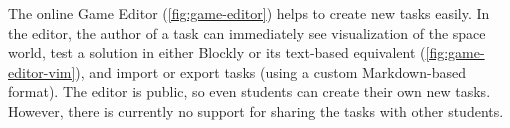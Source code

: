 The online Game Editor (\cref{fig:game-editor})
helps to create new tasks easily.
In the editor, the author of a task can immediately see visualization of the
space world,
test a solution in either Blockly or its text-based equivalent %
(\cref{fig:game-editor-vim}),
and import or export tasks (using a custom Markdown-based format).
The editor is public, so even students can create their own new tasks.
However, there is currently no support for sharing the tasks with other students.


